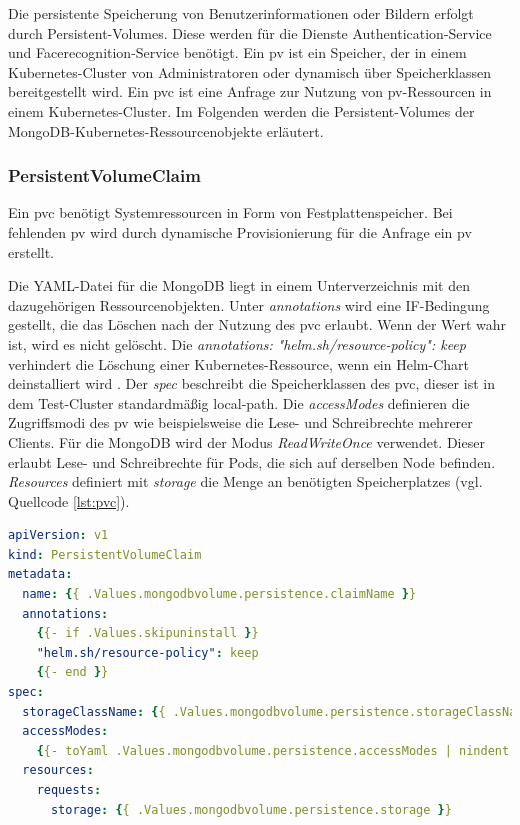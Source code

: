 Die persistente Speicherung von Benutzerinformationen oder Bildern erfolgt durch Persistent-Volumes.
Diese werden für die Dienste Authentication-Service und Facerecognition-Service benötigt.
Ein \ac{pv} ist ein Speicher, der in einem Kubernetes-Cluster von Administratoren oder dynamisch über Speicherklassen bereitgestellt wird.
Ein \ac{pvc} ist eine Anfrage zur Nutzung von \acs{pv}-Ressourcen in einem Kubernetes-Cluster.
Im Folgenden werden die Persistent-Volumes der MongoDB-Kubernetes-Ressourcenobjekte erläutert.


\subsubsection{PersistentVolumeClaim}

Ein \acs{pvc} benötigt Systemressourcen in Form von Festplattenspeicher.
Bei fehlenden \acs{pv} wird durch dynamische Provisionierung für die Anfrage ein \acs{pv} erstellt.

Die YAML-Datei für die MongoDB liegt in einem Unterverzeichnis mit den dazugehörigen Ressourcenobjekten.
Unter \textit{annotations} wird eine IF-Bedingung gestellt, die das Löschen nach der Nutzung des \acs{pvc} erlaubt. 
Wenn der Wert wahr ist, wird es nicht gelöscht.
Die \textit{annotations: }\textit{"helm.sh/resource-policy": keep} verhindert die Löschung einer Kubernetes-Ressource, wenn ein Helm-Chart deinstalliert wird \cite{helmtipsandtricks}.
Der \textit{spec} beschreibt die Speicherklassen des \acs{pvc}, dieser ist in dem Test-Cluster standardmäßig local-path.
Die \textit{accessModes} definieren die Zugriffsmodi des \acs{pv} wie beispielsweise die Lese- und Schreibrechte mehrerer Clients.
Für die MongoDB wird der Modus \textit{ReadWriteOnce} verwendet.
Dieser erlaubt Lese- und Schreibrechte für Pods, die sich auf derselben Node befinden.
\textit{Resources} definiert mit \textit{storage} die Menge an benötigten Speicherplatzes (vgl. Quellcode \ref{lst:pvc}).

\begin{lstlisting}[caption={mongodb-pvc.yaml },captionpos=b,label={lst:pvc},language=yaml]
apiVersion: v1
kind: PersistentVolumeClaim
metadata:
  name: {{ .Values.mongodbvolume.persistence.claimName }}
  annotations:
    {{- if .Values.skipuninstall }}
    "helm.sh/resource-policy": keep
    {{- end }}
spec:
  storageClassName: {{ .Values.mongodbvolume.persistence.storageClassName }}
  accessModes:
    {{- toYaml .Values.mongodbvolume.persistence.accessModes | nindent 4  }}
  resources:
    requests:
      storage: {{ .Values.mongodbvolume.persistence.storage }}
\end{lstlisting}

